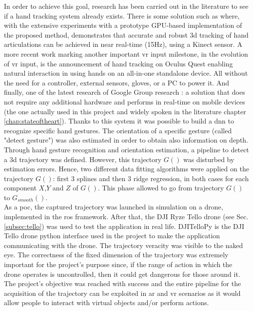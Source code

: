 \noindent In order to achieve this goal, research has been carried out in the literature to see if a hand tracking system already exists. There is some solution such as \cite[]{oikonomidis2011efficient} where, with the extensive experiments with a prototype GPU-based implementation of the proposed method, demonstrates that accurate and robust \gls{3d} tracking of hand articulations can be achieved in near real-time (15Hz), using a Kinect sensor. A more recent work \cite[]{OculusCo32:online} marking another important \gls{vr} input milestone, in the evolution of \gls{vr} input, is the announcement of hand tracking on Oculus Quest enabling natural interaction in using hands on an all-in-one standalone device. All without the need for a controller, external sensors, gloves, or a PC to power it. And finally, one of the latest research of Google Group research \cite[]{zhang2020mediapipe}: a solution that does not require any additional hardware and performs in real-time on mobile devices (the one actually used in this project and widely spoken in the literature chapter \ref{chap:stateoftheart}). Thanks to this system it was possible to build a \gls{dnn} to recognize specific hand gestures. The orientation of a specific gesture (called "detect gesture") was also estimated in order to obtain also information on depth. Through hand gesture recognition and orientation estimation, a pipeline to detect a \gls{3d} trajectory was defined. However, this trajectory $G()$ was disturbed by estimation errors. Hence, two different data fitting algorithms were applied on the trajectory $G()$: first $3$ splines and then $3$ ridge regression, in both cases for each component $X$,$Y$ and $Z$ of $G()$. This phase allowed to go from trajectory $G()$ to $G_{smooth}()$. \\

\noindent As a \gls{poc}, the captured trajectory was launched in simulation on a drone, implemented in the \gls{ros} framework. After that, the DJI Ryze Tello drone (see Sec. \ref{subsec:tello}) was used to test the application in real life. DJITelloPy is the DJI Tello drone python interface used in the project to make the application communicating with the drone. The trajectory veracity was visible to the naked eye. The correctness of the fixed dimension of the trajectory was extremely important for the project’s purpose since, if the range of action in which the drone operates is uncontrolled, then it could get dangerous for those around it. \\

\noindent The project's objective was reached with success and the entire pipeline for the acquisition of the trajectory can be exploited in \gls{ar} and \gls{vr} scenarios as it would allow people to interact with virtual objects and/or perform actions.